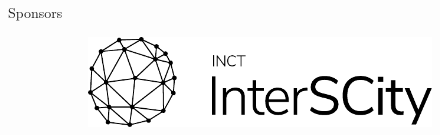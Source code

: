 \documentclass[xcolor={usenames,svgnames,dvipsnames},brazil,english]{beamer}
\begin{document}
\begin{frame}[fragile]
\begin{columns}[T]
  \begin{block}{Sponsors}
    \centering
    \begin{figure}
      \begin{subfigure}{.3\textwidth}
        \centering
        \includegraphics[width=.9\textwidth]{interscity-logo}
      \end{subfigure}
      \begin{subfigure}{.3\textwidth}
        \centering
      \end{subfigure}
      \begin{subfigure}{.3\textwidth}
        \centering
      \end{subfigure}
    \end{figure}
  \end{block}

\end{columns}

\end{frame}
\end{document}
